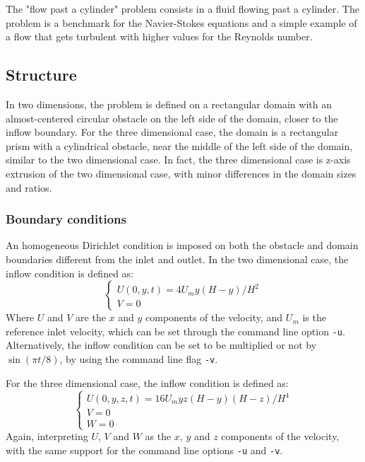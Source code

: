 The "flow past a cylinder" problem consists in a fluid flowing past a cylinder. The problem is a benchmark for the Navier-Stokes equations and a simple example of a flow that gets turbulent with higher values for the Reynolds number.

\subsection{Structure}
In two dimensions, the problem is defined on a rectangular domain with an almost-centered circular obstacle on the left side of the domain, closer to the inflow boundary. For the three dimensional case, the domain is a rectangular prism with a cylindrical obstacle, near the middle of the left side of the domain, similar to the two dimensional case. In fact, the three dimensional case is z-axis extrusion of the two dimensional case, with minor differences in the domain sizes and ratios.

\subsubsection{Boundary conditions}
An homogeneous Dirichlet condition is imposed on both the obstacle and domain boundaries different from the inlet and outlet. In the two dimensional case, the inflow condition is defined as:
\begin{equation}
\begin{cases}
    U(0, y, t) = 4 U_m y (H - y) / H^2 \\
    V = 0
\end{cases}
\end{equation}
Where $U$ and $V$ are the $x$ and $y$ components of the velocity, and $U_m$ is the reference inlet velocity, which can be set through the command line option \texttt{-u}. Alternatively, the inflow condition can be set to be multiplied or not by $\sin(\pi t / 8)$, by using the command line flag \texttt{-v}.

For the three dimensional case, the inflow condition is defined as:
\begin{equation}
\begin{cases}
    U(0, y, z, t) = 16 U_m y z (H - y) (H - z) / H^4 \\
    V = 0 \\
    W = 0
\end{cases}
\end{equation}
Again, interpreting $U$, $V$ and $W$ as the $x$, $y$ and $z$ components of the velocity, with the same support for the command line options \texttt{-u} and \texttt{-v}.

